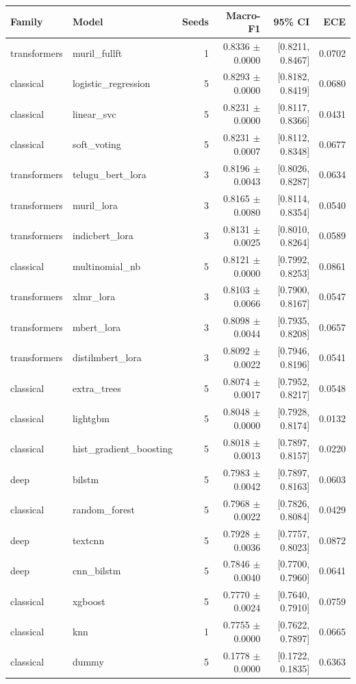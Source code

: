 \begin{tabular}{llrrrr}
\hline
Family & Model & Seeds & Macro-F1 & 95\% CI & ECE \\
\hline
transformers & muril\_fullft & 1 & 0.8336 $\pm$ 0.0000 & [0.8211, 0.8467] & 0.0702 \\
classical & logistic\_regression & 5 & 0.8293 $\pm$ 0.0000 & [0.8182, 0.8419] & 0.0680 \\
classical & linear\_svc & 5 & 0.8231 $\pm$ 0.0000 & [0.8117, 0.8366] & 0.0431 \\
classical & soft\_voting & 5 & 0.8231 $\pm$ 0.0007 & [0.8112, 0.8348] & 0.0677 \\
transformers & telugu\_bert\_lora & 3 & 0.8196 $\pm$ 0.0043 & [0.8026, 0.8287] & 0.0634 \\
transformers & muril\_lora & 3 & 0.8165 $\pm$ 0.0080 & [0.8114, 0.8354] & 0.0540 \\
transformers & indicbert\_lora & 3 & 0.8131 $\pm$ 0.0025 & [0.8010, 0.8264] & 0.0589 \\
classical & multinomial\_nb & 5 & 0.8121 $\pm$ 0.0000 & [0.7992, 0.8253] & 0.0861 \\
transformers & xlmr\_lora & 3 & 0.8103 $\pm$ 0.0066 & [0.7900, 0.8167] & 0.0547 \\
transformers & mbert\_lora & 3 & 0.8098 $\pm$ 0.0044 & [0.7935, 0.8208] & 0.0657 \\
transformers & distilmbert\_lora & 3 & 0.8092 $\pm$ 0.0022 & [0.7946, 0.8196] & 0.0541 \\
classical & extra\_trees & 5 & 0.8074 $\pm$ 0.0017 & [0.7952, 0.8217] & 0.0548 \\
classical & lightgbm & 5 & 0.8048 $\pm$ 0.0000 & [0.7928, 0.8174] & 0.0132 \\
classical & hist\_gradient\_boosting & 5 & 0.8018 $\pm$ 0.0013 & [0.7897, 0.8157] & 0.0220 \\
deep & bilstm & 5 & 0.7983 $\pm$ 0.0042 & [0.7897, 0.8163] & 0.0603 \\
classical & random\_forest & 5 & 0.7968 $\pm$ 0.0022 & [0.7826, 0.8084] & 0.0429 \\
deep & textcnn & 5 & 0.7928 $\pm$ 0.0036 & [0.7757, 0.8023] & 0.0872 \\
deep & cnn\_bilstm & 5 & 0.7846 $\pm$ 0.0040 & [0.7700, 0.7960] & 0.0641 \\
classical & xgboost & 5 & 0.7770 $\pm$ 0.0024 & [0.7640, 0.7910] & 0.0759 \\
classical & knn & 1 & 0.7755 $\pm$ 0.0000 & [0.7622, 0.7897] & 0.0665 \\
classical & dummy & 5 & 0.1778 $\pm$ 0.0000 & [0.1722, 0.1835] & 0.6363 \\
\hline
\end{tabular}
